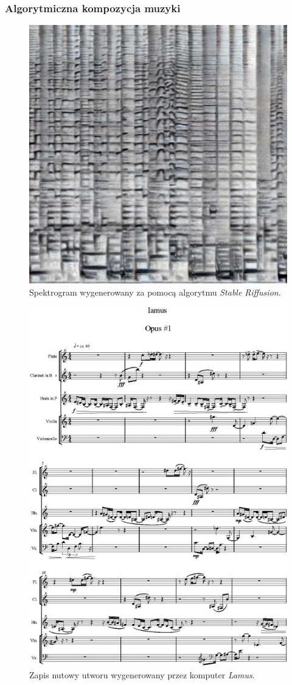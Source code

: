 \documentclass[]{beamer}
\begin{document}
\begin{frame}
\begin{multicols}{2}
  \end{multicols}
\end{frame}

\begin{frame}
  \frametitle{Algorytmiczna kompozycja muzyki}

  \begin{multicols}{2}
  \begin{figure}
    \includegraphics[width=0.8\linewidth]{riffusion_spectro.jpg}
    \caption{Spektrogram wygenerowany za pomocą algorytmu \textit{Stable Riffusion}.}
  \end{figure}
  \begin{figure}
    \includegraphics[width=0.6\linewidth]{lamus_notes.jpg}
    \caption{Zapis nutowy utworu wygenerowany przez komputer \textit{Lamus}.}
  \end{figure}

  \end{multicols}
\end{frame}
\end{document}
